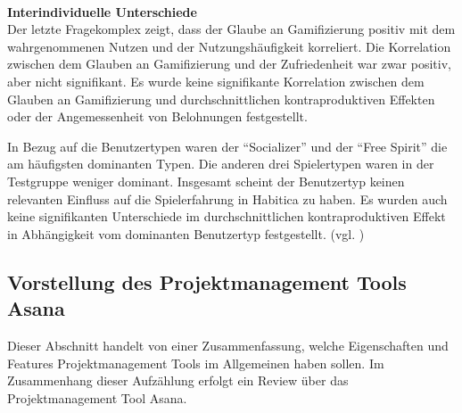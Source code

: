 \documentclass[sigconf, nonacm]{acmart}
\begin{document}
\\
\textbf{Interindividuelle Unterschiede}
\\
Der letzte Fragekomplex zeigt, dass der Glaube an Gamifizierung positiv mit dem wahrgenommenen Nutzen und der Nutzungshäufigkeit korreliert. Die Korrelation zwischen dem Glauben an Gamifizierung und der Zufriedenheit war zwar positiv, aber nicht signifikant. Es wurde keine signifikante Korrelation zwischen dem Glauben an Gamifizierung und durchschnittlichen kontraproduktiven Effekten oder der Angemessenheit von Belohnungen festgestellt.

In Bezug auf die Benutzertypen waren der \enquote{Socializer} und der \enquote{Free Spirit} die am häufigsten dominanten Typen. Die anderen drei Spielertypen waren in der Testgruppe weniger dominant. Insgesamt scheint der Benutzertyp keinen relevanten Einfluss auf die Spielerfahrung in Habitica zu haben. Es wurden auch keine signifikanten Unterschiede im durchschnittlichen kontraproduktiven Effekt in Abhängigkeit vom dominanten Benutzertyp festgestellt. (vgl. \citep{diefenbach_counterproductive_2019})

\subsection{Vorstellung des Projektmanagement Tools Asana}\label{sec:asana}
Dieser Abschnitt handelt von einer Zusammenfassung, welche Eigenschaften und Features Projektmanagement Tools im Allgemeinen haben sollen. Im Zusammenhang dieser Aufzählung erfolgt ein Review über das Projektmanagement Tool Asana.
\end{document}
